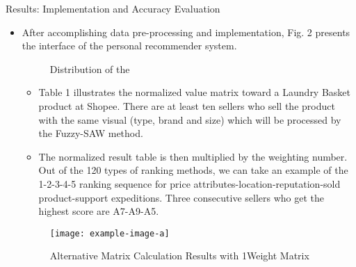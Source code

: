 \documentclass[final,hyperref={pdfpagelabels=false}]{beamer}
\begin{document}
\begin{frame}[t]
\begin{columns}[t]
\begin{column}{.465\textwidth} %



\begin{block}{Results: Implementation and Accuracy Evaluation}

\begin{itemize}
\item After accomplishing data pre-processing and implementation, Fig. 2 presents the interface of the personal recommender system.

\begin{figure}
\caption{Distribution of the }
\end{figure}

\begin{itemize}
\item Table 1 illustrates the normalized value matrix toward a Laundry Basket product at Shopee. There are at least ten sellers who sell the product with the same visual (type, brand and size) which will be processed by the Fuzzy-SAW method. 
\item  The normalized result table is then multiplied by the weighting number. Out of the 120 types of ranking methods, we can take an example of the 1-2-3-4-5 ranking sequence for price attributes-location-reputation-sold product-support expeditions. Three consecutive sellers who get the highest score are A7-A9-A5.
\end{itemize}

\begin{figure}
\texttt{[image: example-image-a]}
\caption{Alternative Matrix Calculation Results with 1Weight Matrix}
\end{figure}


\end{itemize}
\end{block}
\end{column}
\end{columns}
\end{frame}
\end{document}
